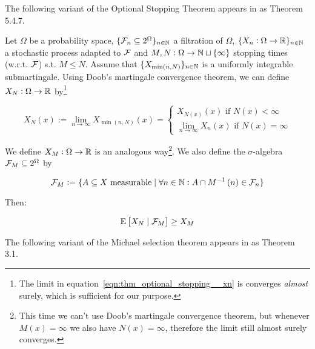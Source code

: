 The following variant of the Optional Stopping Theorem appears in \cite{Durrett_2010} as Theorem 5.4.7.

\begin{samepage}
\begin{theorem}
\label{thm:optional_stopping}

Let ${\Omega}$ be a probability space, ${\{\mathcal{F}_n \subseteq 2^\Omega\}_{n \in \mathbb{N}}}$ a filtration of ${\Omega}$, ${\{X_n: \Omega \rightarrow \mathbb{R}\}_{n \in \mathbb{N}}}$ a stochastic process adapted to ${\mathcal{F}}$ and ${M,N: \Omega \rightarrow \mathbb{N} \sqcup \{\infty\}}$ stopping times (w.r.t. ${\mathcal{F}}$) s.t. ${M \leq N}$. Assume that ${\{X_{\min\left(n,N\right)}\}_{n \in \mathbb{N}}}$ is a uniformly integrable submartingale. Using Doob's martingale convergence theorem, we can define ${X_N : \Omega \rightarrow \mathbb{R}}$ by\footnote{The limit in equation~\ref{eqn:thm_optional_stopping__xn} is converges \emph{almost} surely, which is sufficient for our purpose.}

\begin{equation}
\label{eqn:thm_optional_stopping__xn}
X_N\left(x\right):=\lim_{n \rightarrow \infty} X_{\min\left(n,N\right)}\left(x\right)=\begin{cases}X_{N\left(x\right)}\left(x\right) \text{ if } N\left(x\right) < \infty\\\lim_{n \rightarrow \infty} X_n\left(x\right) \text{ if } N\left(x\right) = \infty\end{cases}
\end{equation}

We define ${X_M: \Omega \rightarrow \mathbb{R}}$ is an analogous way\footnote{This time we can't use Doob's martingale convergence theorem, but whenever ${M\left(x\right) = \infty}$ we also have ${N\left(x\right) = \infty}$, therefore the limit still almost surely converges.}. We also define the $\sigma$-algebra ${\mathcal{F}_M \subseteq 2^\Omega}$ by

\begin{equation}
\mathcal{F}_M:=\{A \subseteq X \text{ measurable} \mid \forall n \in \mathbb{N}: A \cap M^{-1}\left(n\right) \in \mathcal{F}_n\}
\end{equation}

Then:

\begin{equation}
\operatorname{E}\left[X_N \mid \mathcal{F}_M\right] \geq X_M
\end{equation}

\end{theorem}
\end{samepage}

The following variant of the Michael selection theorem appears in \cite{Yannelis_1983} as Theorem 3.1.

